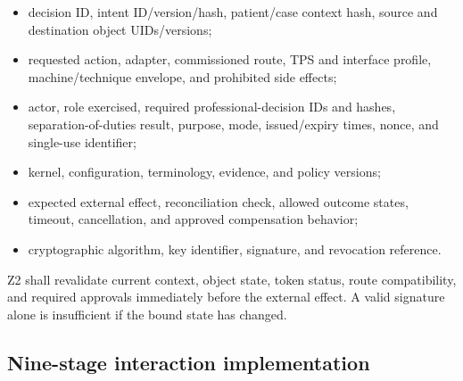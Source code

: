 \documentclass[11pt,letterpaper]{article}
\begin{document}
\begin{itemize}
\item decision ID, intent ID/version/hash, patient/case context hash, source and destination object UIDs/versions;
\item requested action, adapter, commissioned route, TPS and interface profile, machine/technique envelope, and prohibited side effects;
\item actor, role exercised, required professional-decision IDs and hashes, separation-of-duties result, purpose, mode, issued/expiry times, nonce, and single-use identifier;
\item kernel, configuration, terminology, evidence, and policy versions;
\item expected external effect, reconciliation check, allowed outcome states, timeout, cancellation, and approved compensation behavior;
\item cryptographic algorithm, key identifier, signature, and revocation reference.
\end{itemize}

Z2 shall revalidate current context, object state, token status, route compatibility, and required approvals immediately before the external effect. A valid signature alone is insufficient if the bound state has changed.

\subsection{Nine-stage interaction implementation}
\end{document}
